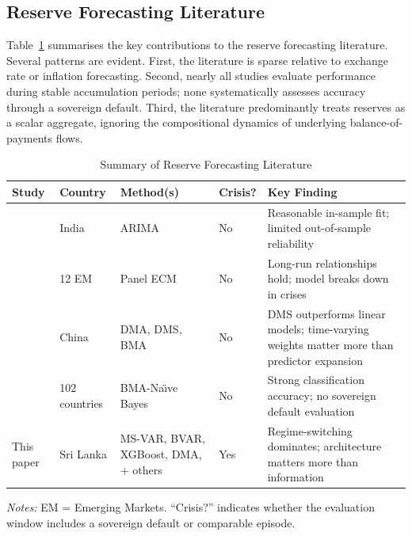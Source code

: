\documentclass[12pt,a4paper]{article}
\begin{document}
\subsection{Reserve Forecasting Literature}

Table~\ref{tab:lit_summary} summarises the key contributions to the reserve forecasting literature. Several patterns are evident. First, the literature is sparse relative to exchange rate or inflation forecasting. Second, nearly all studies evaluate performance during stable accumulation periods; none systematically assesses accuracy through a sovereign default. Third, the literature predominantly treats reserves as a scalar aggregate, ignoring the compositional dynamics of underlying balance-of-payments flows.

\begin{table}[htbp]
\centering
\caption{Summary of Reserve Forecasting Literature}
\label{tab:lit_summary}
\begin{tabular}{p{3.2cm}p{2.2cm}p{3cm}p{1.5cm}p{3.5cm}}
\toprule
Study & Country & Method(s) & Crisis? & Key Finding \\
\midrule
\cite{SehgalSharma2008} & India & ARIMA & No & Reasonable in-sample fit; limited out-of-sample reliability \\
\cite{Gosselin2005} & 12 EM & Panel ECM & No & Long-run relationships hold; model breaks down in crises \\
\cite{Gupta2014} & China & DMA, DMS, BMA & No & DMS outperforms linear models; time-varying weights matter more than predictor expansion \\
\cite{Salas2025} & 102 countries & BMA-Na\"{\i}ve Bayes & No & Strong classification accuracy; no sovereign default evaluation \\
This paper & Sri Lanka & MS-VAR, BVAR, XGBoost, DMA, + others & Yes & Regime-switching dominates; architecture matters more than information \\
\bottomrule
\end{tabular}
\begin{tablenotes}
\small
\item \textit{Notes:} EM = Emerging Markets. ``Crisis?'' indicates whether the evaluation window includes a sovereign default or comparable episode.
\end{tablenotes}
\end{table}
\end{document}
